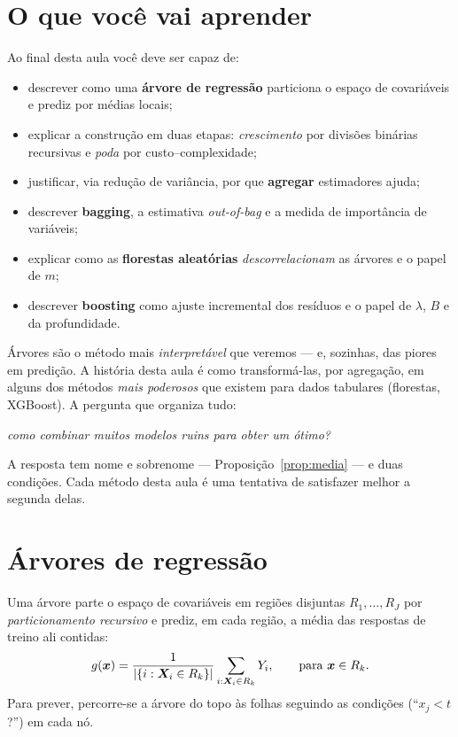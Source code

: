 \documentclass[11pt,a4paper]{article}
\title{}
\date{}
\begin{document}

\section*{O que você vai aprender}
Ao final desta aula você deve ser capaz de:
\begin{itemize}[leftmargin=1.4cm]
  \item descrever como uma \textbf{árvore de regressão} particiona o espaço de
        covariáveis e prediz por médias locais;
  \item explicar a construção em duas etapas: \emph{crescimento} por divisões
        binárias recursivas e \emph{poda} por custo--complexidade;
  \item justificar, via redução de variância, por que \textbf{agregar} estimadores
        ajuda;
  \item descrever \textbf{bagging}, a estimativa \emph{out-of-bag} e a medida de
        importância de variáveis;
  \item explicar como as \textbf{florestas aleatórias} \emph{descorrelacionam} as
        árvores e o papel de $m$;
  \item descrever \textbf{boosting} como ajuste incremental dos resíduos e o papel
        de $\lambda$, $B$ e da profundidade.
\end{itemize}

\noindent
Árvores são o método mais \emph{interpretável} que veremos --- e, sozinhas, das
piores em predição. A história desta aula é como transformá-las, por agregação, em
alguns dos métodos \emph{mais poderosos} que existem para dados tabulares
(florestas, XGBoost). A pergunta que organiza tudo:

\begin{center}\itshape
  como combinar muitos modelos ruins para obter um ótimo?
\end{center}

\noindent
A resposta tem nome e sobrenome --- Proposição~\ref{prop:media} --- e duas condições.
Cada método desta aula é uma tentativa de satisfazer melhor a segunda delas.

\section{Árvores de regressão}
Uma árvore parte o espaço de covariáveis em regiões disjuntas $R_1,\dots,R_J$ por
\emph{particionamento recursivo} e prediz, em cada região, a média das respostas de
treino ali contidas:
\begin{equation}\label{eq:arvore}
  g(\bm{x}) = \frac{1}{\left\lvert \{i:\bm{X}_i\in R_k\} \right\rvert}\sum_{i:\bm{X}_i\in R_k} Y_i,
  \qquad \text{para } \bm{x}\in R_k .
\end{equation}
Para prever, percorre-se a árvore do topo às folhas seguindo as condições
(``$x_j<t$?'') em cada nó.
\end{document}
